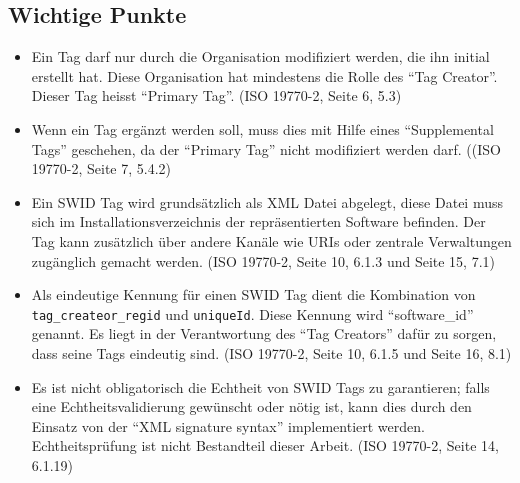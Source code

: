 \subsection{Wichtige Punkte}
\begin{itemize}
	\item Ein Tag darf nur durch die Organisation modifiziert werden, die ihn
	initial erstellt hat. Diese Organisation hat mindestens die Rolle des
	\enquote{Tag Creator}. Dieser Tag heisst \enquote{Primary Tag}. (ISO
	19770-2\cite{iso19770-2}, Seite 6, 5.3)
	
	\item Wenn ein Tag ergänzt werden soll, muss dies mit Hilfe eines
	\enquote{Supplemental Tags} geschehen, da der \enquote{Primary Tag} nicht
	modifiziert werden darf. ((ISO 19770-2\cite{iso19770-2}, Seite 7, 5.4.2)
	
	\item Ein SWID Tag wird grundsätzlich als XML Datei abgelegt, diese Datei muss
	sich im Installationsverzeichnis der repräsentierten Software befinden. Der Tag
	kann zusätzlich über andere Kanäle wie URIs oder zentrale Verwaltungen
	zugänglich gemacht werden. (ISO 19770-2\cite{iso19770-2}, Seite 10, 6.1.3 und
	Seite 15, 7.1)
	
	\item Als eindeutige Kennung für einen SWID Tag dient die Kombination von
	\texttt{tag\_createor\_regid} und \texttt{uniqueId}. Diese Kennung wird
	\enquote{software\_id} genannt. Es liegt in der Verantwortung des \enquote{Tag
	Creators} dafür zu sorgen, dass seine Tags eindeutig sind. (ISO
	19770-2\cite{iso19770-2}, Seite 10, 6.1.5 und Seite 16, 8.1)
	
	\item Es ist nicht obligatorisch die Echtheit von SWID Tags zu garantieren;
	falls eine Echtheitsvalidierung gewünscht oder nötig ist, kann dies durch den
	Einsatz von der \enquote{XML signature syntax}\cite{bartel2002xml}
	implementiert werden. Echtheitsprüfung ist nicht Bestandteil dieser Arbeit.
	(ISO 19770-2\cite{iso19770-2}, Seite 14, 6.1.19)
	

\end{itemize}
